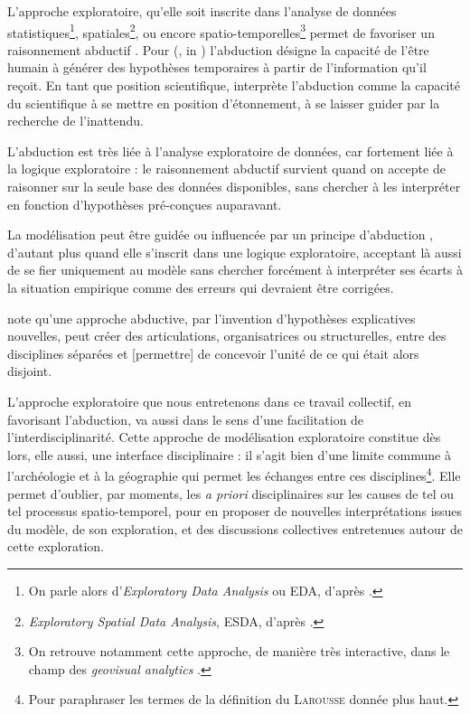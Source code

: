L'approche exploratoire, qu'elle soit inscrite dans l'analyse de données statistiques\footnote{
On parle alors d'\textit{Exploratory Data Analysis} ou \og EDA\fg{}, d'après \textcite{tukey_exploratory_1977}.
}, spatiales\footnote{
\textit{Exploratory Spatial Data Analysis}, \og ESDA\fg{}, d'après \textcites{brunsdon_exploratory_1998,haining_exploratory_1998}.
}, ou encore spatio-temporelles\footnote{
	On retrouve notamment cette approche, de manière très interactive, dans le champ des \textit{geovisual analytics} \autocite{andrienko_exploratory_2006}.
} permet de favoriser un raisonnement abductif \autocite{banos2005voie}.
Pour \citeauthor{yu_abduction_1994} (\citeyear{yu_abduction_1994}, in \textcite[2]{banos2005voie}) l'abduction désigne la \og capacité de l'être humain à générer des hypothèses temporaires à partir de l'information qu'il reçoit\fg{}.
En tant que position scientifique, \textcite[2]{banos2005voie} interprète l'abduction comme \og la capacité du scientifique à se mettre en position d’étonnement, à se laisser guider par la recherche de l'inattendu\fg{}.

L'abduction est très liée à l'analyse exploratoire de données, car fortement liée à la logique exploratoire : le raisonnement abductif survient quand on accepte de raisonner sur la seule base des données disponibles, sans chercher à les interpréter en fonction d'hypothèses pré-conçues auparavant.

La modélisation peut être guidée ou influencée par un principe d'abduction \autocite[77]{banos_pour_2013}, d'autant plus quand elle s'inscrit dans une logique exploratoire, acceptant là aussi de se fier \og uniquement\fg{} au modèle sans chercher forcément à interpréter ses écarts à la situation empirique comme des erreurs qui devraient être corrigées.

\textcite{morin1994interdisciplinarite} note qu'une approche abductive, par \og l'invention d'hypothèses explicatives nouvelles\fg{}, peut créer \og des articulations, organisatrices ou structurelles, entre des disciplines séparées et [permettre] de concevoir l'unité de ce qui était alors disjoint\fg{}.

L'approche exploratoire que nous entretenons dans ce travail collectif, en favorisant l'abduction, va aussi dans le sens d'une facilitation de l'interdisciplinarité.
Cette approche de modélisation exploratoire constitue dès lors, elle aussi, une interface disciplinaire : il s'agit bien d'une limite commune à l'archéologie et à la géographie qui permet les échanges entre ces disciplines\footnote{
	Pour paraphraser les termes de la définition du \textsc{Larousse} donnée plus haut.
}.
Elle permet d'oublier, par moments, les \textit{a priori} disciplinaires sur les causes de tel ou tel processus spatio-temporel, pour en proposer de nouvelles interprétations issues du modèle, de son exploration, et des discussions collectives entretenues autour de cette exploration.

